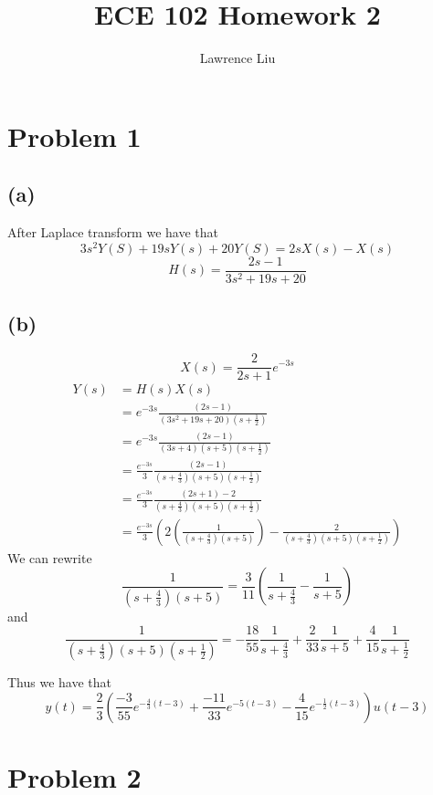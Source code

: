 \documentclass[12pt]{article}
\title{ECE 102 Homework 2}
\author{Lawrence Liu}
\begin{document}
\maketitle
\section*{Problem 1}
\subsection*{(a)}
After Laplace transform we have that
$$3s^2Y(S)+19sY(s)+20Y(S)=2sX(s)-X(s)$$
$$H(s)=\boxed{\frac{2s-1}{3s^2+19s+20}}$$
\subsection*{(b)}
$$X(s)=\frac{2}{2s+1}e^{-3s}$$
\begin{align*}
Y(s)&=H(s)X(s)\\
&=e^{-3s}\frac{(2s-1)}{(3s^2+19s+20)(s+\frac{1}{2})}\\
&=e^{-3s}\frac{(2s-1)}{(3s+4)(s+5)(s+\frac{1}{2})}\\
&=\frac{e^{-3s}}{3}\frac{(2s-1)}{(s+\frac{4}{3})(s+5)(s+\frac{1}{2})}\\
&=\frac{e^{-3s}}{3}\frac{(2s+1)-2}{(s+\frac{4}{3})(s+5)(s+\frac{1}{2})}\\
&=\frac{e^{-3s}}{3}\left( 2\left(\frac{1}{(s+\frac{4}{3})(s+5)}\right)-\frac{2}{(s+\frac{4}{3})(s+5)(s+\frac{1}{2})}\right)
\end{align*}
We can rewrite 
$$\frac{1}{(s+\frac{4}{3})(s+5)}=\frac{3}{11}\left(\frac{1}{s+\frac{4}{3}}-\frac{1}{s+5}\right)$$
and 
$$\frac{1}{(s+\frac{4}{3})(s+5)(s+\frac{1}{2})}=-\frac{18}{55}\frac{1}{s+\frac{4}{3}}+\frac{2}{33}\frac{1}{s+5}+\frac{4}{15}\frac{1}{s+\frac{1}{2}}$$

Thus we have that
$$y(t)=\boxed{\frac{2}{3}\left(\frac{-3}{55}e^{-\frac{4}{3}(t-3)}+\frac{-11}{33}e^{-5(t-3)}-\frac{4}{15}e^{-\frac{1}{2}(t-3)}\right)u(t-3)}$$

\section*{Problem 2}
\end{document}
